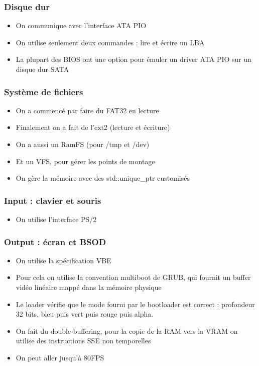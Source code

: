 \documentclass{beamer}
\begin{document}
\begin{frame}
    \frametitle{Disque dur}
    \begin{itemize}
        \item On communique avec l'interface ATA PIO
        \item On utilise seulement deux commandes : lire et écrire un LBA
        \item La plupart des BIOS ont une option pour émuler un driver ATA PIO sur un disque dur SATA
    \end{itemize}
\end{frame}


\begin{frame}
    \frametitle{Système de fichiers}
    \begin{itemize}
        \item On a commencé par faire du FAT32 en lecture
        \item Finalement on a fait de l'ext2 (lecture et écriture)
        \item On a aussi un RamFS (pour /tmp et /dev)
        \item Et un VFS, pour gérer les points de montage
        \item On gère la mémoire avec des std::unique\_ptr customisés
    \end{itemize}
\end{frame}

\begin{frame}
    \frametitle{Input : clavier et souris}
    \begin{itemize}
        \item On utilise l'interface PS/2
    \end{itemize}
\end{frame}

\begin{frame}
    \frametitle{Output : écran et BSOD}
    \begin{itemize}
        \item On utilise la spécification VBE
        \item Pour cela on utilise la convention multiboot de GRUB, qui fournit un buffer vidéo linéaire mappé dans la mémoire physique
        \item Le loader vérifie que le mode fourni par le bootloader est correct : profondeur 32 bits, bleu puis vert puis rouge puis alpha.
        \item On fait du double-buffering, pour la copie de la RAM vers la VRAM on utilise des instructions SSE non temporelles
        \item On peut aller jusqu'à 80FPS
    \end{itemize}
\end{frame}
\end{document}
